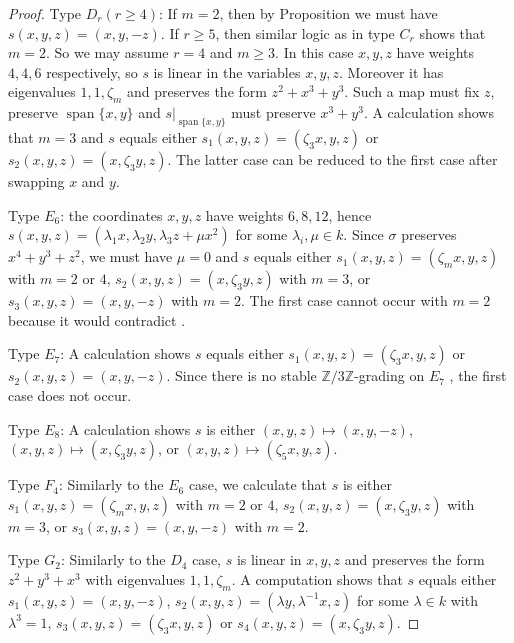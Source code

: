 \documentclass{article} %
\numberwithin{equation}{section}
\theoremstyle{definition}
\newcommand{\Z}{\mathbb{Z}}
\DeclareMathOperator{\spn}{span}
\newcommand{\rl}{r} %
\begin{document}
\begin{proof}
Type $D_\rl (\rl \geq 4)$:  
If $m=2$, then by Proposition \cite[Proposition 3.11]{Thorne-thesis} we must have $s(x,y,z) = (x,y,-z)$.
If $\rl\geq 5$, then similar logic as in type $C_\rl$ shows that $m=2$.
So we may assume $\rl=4$ and $m\geq 3$. In this case $x, y, z$ have weights $4, 4, 6$ respectively, so $s$ is linear in the variables $x,y,z$. 
Moreover it has eigenvalues $1, 1, \zeta_m$ and preserves the form $z^2 + x^3 + y^3$.
Such a map must fix $z$, preserve $\spn\{x,y\}$ and $s\vert_{\spn\{x,y\}}$ must preserve $x^3+ y^3$.
A calculation shows that $m=3$ and $s$ equals either $s_1(x,y,z) = (\zeta_3x,y,z)$ or $s_2(x,y,z) = (x, \zeta_3y,z)$.
The latter case can be reduced to the first case after swapping $x$ and $y$.

Type $E_6$: the coordinates $x,y,z$ have weights $6,8,12$, hence $s(x,y,z)= (\lambda_1 x,\lambda_2y,\lambda_3 z + \mu x^2)$ for some $\lambda_i, \mu \in k$.
Since $\sigma$ preserves $x^4 + y^3 + z^2$, we must have $\mu=0$ and $s$ equals either $s_1(x,y,z) = (\zeta_mx,y,z)$ with $m=2$ or $4$, $s_2(x,y,z) = (x,\zeta_3y,z)$ with $m=3$, or $s_3(x,y,z) = (x,y,-z)$ with $m=2$.
The first case cannot occur with $m=2$ because it would contradict \cite[Proposition 3.11]{Thorne-thesis}.



Type $E_7$: A calculation shows $s$ equals either $s_1(x,y,z) = (\zeta_3x,y,z)$ or $s_2(x,y,z) = (x,y,-z)$.
Since there is no stable $\Z/3\Z$-grading on $E_7$ \cite[Section 7.1, Table 4]{GrossLevyReederYu-GradingsPosRank}, the first case does not occur.

Type $E_8$: A calculation shows $s$ is either $(x,y,z)\mapsto (x,y,-z)$, $(x,y,z)\mapsto (x,\zeta_3y,z)$, or $(x,y,z)\mapsto (\zeta_5x,y,z)$. 

Type $F_4$: Similarly to the $E_6$ case, we calculate that $s$ is either $s_1(x,y,z) = (\zeta_mx,y,z)$ with $m=2$ or $4$, $s_2(x,y,z) = (x,\zeta_3y,z)$ with $m=3$, or $s_3(x,y,z) = (x,y,-z)$ with $m=2$.

Type $G_2$: Similarly to the $D_4$ case, $s$ is linear in $x,y,z$ and preserves the form $z^2+ y^3 + x^3$ with eigenvalues $1,1,\zeta_m$.
A computation shows that $s$ equals either $s_1(x,y,z) = (x,y,-z)$, $s_2(x,y,z) = (\lambda y,\lambda^{-1} x,z)$ for some $\lambda\in k$ with $\lambda^3 = 1$, $s_3(x,y,z) = (\zeta_3x,y,z)$ or $s_4(x,y,z) = (x,\zeta_3y,z)$.
\end{proof}
\end{document}
